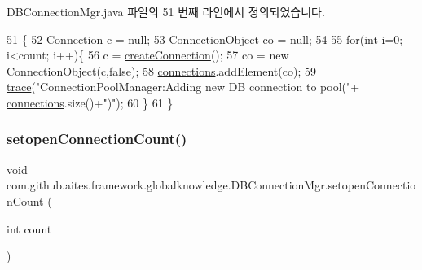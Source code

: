D\+B\+Connection\+Mgr.\+java 파일의 51 번째 라인에서 정의되었습니다.


\begin{DoxyCode}
51                                                                                  \{
52         Connection c = null;
53         ConnectionObject co = null;
54         
55         \textcolor{keywordflow}{for}(\textcolor{keywordtype}{int} i=0; i<count; i++)\{
56             c = \mbox{\hyperlink{classcom_1_1github_1_1aites_1_1framework_1_1globalknowledge_1_1_d_b_connection_mgr_a5000396759d53cd8e80b9951cdf6fda9}{createConnection}}();
57             co = \textcolor{keyword}{new} ConnectionObject(c,\textcolor{keyword}{false});
58             \mbox{\hyperlink{classcom_1_1github_1_1aites_1_1framework_1_1globalknowledge_1_1_d_b_connection_mgr_a2a178e6371fa020ccca3e12574ef2e14}{connections}}.addElement(co);
59             \mbox{\hyperlink{classcom_1_1github_1_1aites_1_1framework_1_1globalknowledge_1_1_d_b_connection_mgr_ae9ff677183d99acafb2da9cd8ba6de20}{trace}}(\textcolor{stringliteral}{"ConnectionPoolManager:Adding new DB connection to pool("}+
      \mbox{\hyperlink{classcom_1_1github_1_1aites_1_1framework_1_1globalknowledge_1_1_d_b_connection_mgr_a2a178e6371fa020ccca3e12574ef2e14}{connections}}.size()+\textcolor{stringliteral}{")"});
60         \}
61     \}
\end{DoxyCode}
\mbox{\label{classcom_1_1github_1_1aites_1_1framework_1_1globalknowledge_1_1_d_b_connection_mgr_aafc8308231c9c60eb1fc54b0179037b4}} 
\subsubsection{\texorpdfstring{setopen\+Connection\+Count()}{setopenConnectionCount()}}
{\footnotesize\ttfamily void com.\+github.\+aites.\+framework.\+globalknowledge.\+D\+B\+Connection\+Mgr.\+setopen\+Connection\+Count (\begin{DoxyParamCaption}\item[{int}]{count }\end{DoxyParamCaption})}



